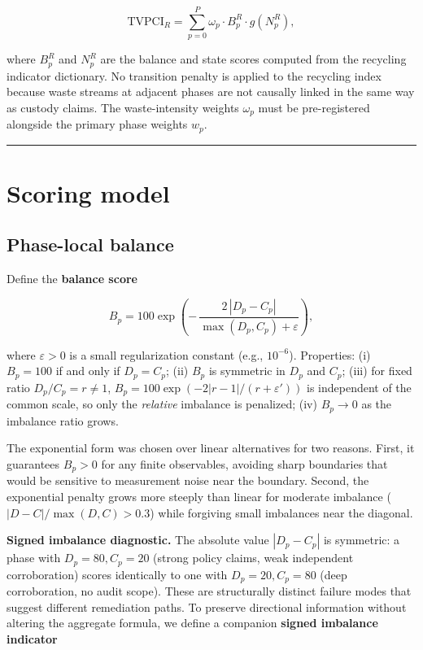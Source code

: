 \documentclass[12pt]{article}
\begin{document}
\[\mathrm{TVPCI}_R = \sum_{p=0}^{P} \omega_p \cdot B^R_p \cdot g(N^R_p),\]

where \(B^R_p\) and \(N^R_p\) are the balance and state scores computed
from the recycling indicator dictionary. No transition penalty is
applied to the recycling index because waste streams at adjacent phases
are not causally linked in the same way as custody claims. The
waste-intensity weights \(\omega_p\) must be pre-registered alongside
the primary phase weights \(w_p\).

\begin{center}\rule{0.5\linewidth}{0.5pt}\end{center}

\section{Scoring model}\label{scoring-model}

\subsection{Phase-local balance}\label{phase-local-balance}

Define the \textbf{balance score}

\[B_p = 100 \exp\!\left(-\,\frac{2\,|D_p - C_p|}{\max(D_p, C_p) + \varepsilon}\right),\]

where \(\varepsilon > 0\) is a small regularization constant (e.g.,
\(10^{-6}\)). Properties: (i) \(B_p = 100\) if and only if
\(D_p = C_p\); (ii) \(B_p\) is symmetric in \(D_p\) and \(C_p\); (iii)
for fixed ratio \(D_p/C_p = r \neq 1\),
\(B_p = 100 \exp(-2|r-1|/(r+\varepsilon'))\) is independent of the
common scale, so only the \emph{relative} imbalance is penalized; (iv)
\(B_p \rightarrow 0\) as the imbalance ratio grows.

The exponential form was chosen over linear alternatives for two
reasons. First, it guarantees \(B_p > 0\) for any finite observables,
avoiding sharp boundaries that would be sensitive to measurement noise
near the boundary. Second, the exponential penalty grows more steeply
than linear for moderate imbalance (\(|D-C|/\max(D,C) > 0.3\)) while
forgiving small imbalances near the diagonal.

\textbf{Signed imbalance diagnostic.} The absolute value \(|D_p - C_p|\)
is symmetric: a phase with \(D_p = 80, C_p = 20\) (strong policy claims,
weak independent corroboration) scores identically to one with
\(D_p = 20, C_p = 80\) (deep corroboration, no audit scope). These are
structurally distinct failure modes that suggest different remediation
paths. To preserve directional information without altering the
aggregate formula, we define a companion \textbf{signed imbalance
indicator}
\end{document}
